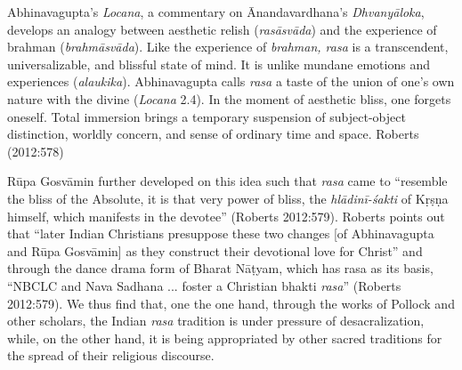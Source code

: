 \begin{myquote}
Abhinavagupta's \textsl{Locana}, a commentary on Ānandavardhana's \textsl{Dhvanyāloka}, develops an analogy between aesthetic relish (\textsl{rasāsvāda}) and the experience of brahman (\textsl{brahmāsvāda}). Like the experience of \textsl{brahman, rasa} is a transcendent, universalizable, and blissful state of mind. It is unlike mundane emotions and experiences (\textsl{alaukika}). Abhinavagupta calls \textsl{rasa} a taste of the union of one's own nature with the divine (\textsl{Locana} 2.4). In the moment of aesthetic bliss, one forgets oneself. Total immersion brings a temporary suspension of subject-object distinction, worldly concern, and sense of ordinary time and space. 
\hfill Roberts (2012:578)
\end{myquote}

Rūpa Gosvāmin further developed on this idea such that \textsl{rasa} came to ``resemble the bliss of the Absolute, it is that very power of bliss, the \textsl{hlādinī-śakti} of Kṛṣṇa himself, which manifests in the devotee'' (Roberts 2012:579). Roberts points out that ``later Indian Christians presuppose these two changes [of Abhinavagupta and Rūpa Gosvāmin] as they construct their devotional love for Christ'' and through the dance drama form of Bharat Nāṭyam, which has rasa as its basis, ``NBCLC and Nava Sadhana ... foster a Christian bhakti \textsl{rasa}'' (Roberts 2012:579). We thus find that, one the one hand, through the works of Pollock and other scholars, the Indian \textsl{rasa} tradition is under pressure of desacralization, while, on the other hand, it is being appropriated by other sacred traditions for the spread of their religious discourse.

